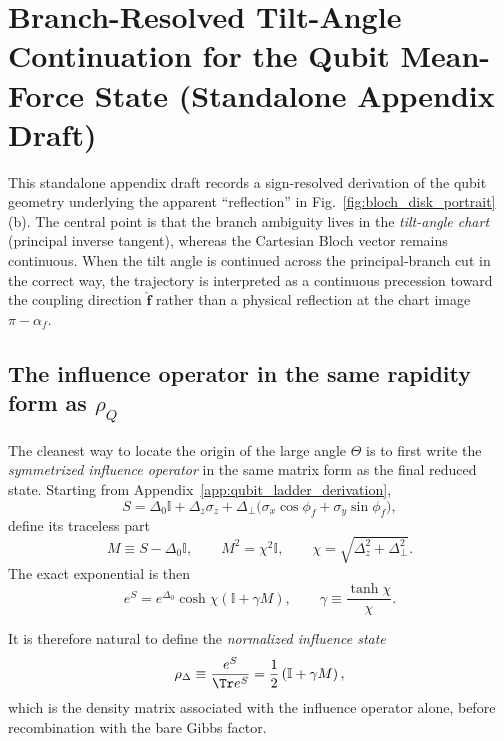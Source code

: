 \section{Branch-Resolved Tilt-Angle Continuation for the Qubit Mean-Force State (Standalone Appendix Draft)}
\label{app:branch_alignment_codex}

This standalone appendix draft records a sign-resolved derivation of the qubit
geometry underlying the apparent ``reflection'' in
Fig.~\ref{fig:bloch_disk_portrait}(b).  The central point is that the branch
ambiguity lives in the \emph{tilt-angle chart} (principal inverse tangent),
whereas the Cartesian Bloch vector remains continuous.  When the tilt angle is
continued across the principal-branch cut in the correct way, the trajectory is
interpreted as a continuous precession toward the coupling direction
$\hat{\mathbf f}$ rather than a physical reflection at the chart image
$\pi-\alpha_f$.

\subsection{The influence operator in the same rapidity form as $\rho_Q$}

The cleanest way to locate the origin of the large angle $\Theta$ is to first
write the \emph{symmetrized influence operator} in the same matrix form as the
final reduced state.  Starting from Appendix~\ref{app:qubit_ladder_derivation},
\begin{equation}
    S = \Delta_0 \mathbb{I} + \Delta_z \sigma_z
      + \Delta_\perp \bigl(\sigma_x\cos\phi_f + \sigma_y\sin\phi_f\bigr),
    \label{eq:branch_codex_S_def}
\end{equation}
define its traceless part
\begin{equation}
    M \equiv S-\Delta_0\mathbb{I},
    \qquad
    M^2=\chi^2\mathbb{I},
    \qquad
    \chi = \sqrt{\Delta_z^2+\Delta_\perp^2}.
\end{equation}
The exact exponential is then
\begin{equation}
    e^S = e^{\Delta_0}\cosh\chi\left(\mathbb{I} + \gamma M\right),
    \qquad
    \gamma \equiv \frac{\tanh\chi}{\chi}.
    \label{eq:branch_codex_expS}
\end{equation}

It is therefore natural to define the \emph{normalized influence state}
\begin{equation}
    \rho_{\Delta} \equiv \frac{e^S}{\Tr e^S}
    = \frac{1}{2}\left(\mathbb{I} + \gamma M\right),
    \label{eq:branch_codex_rhoDelta}
\end{equation}
which is the density matrix associated with the influence operator alone,
before recombination with the bare Gibbs factor.

